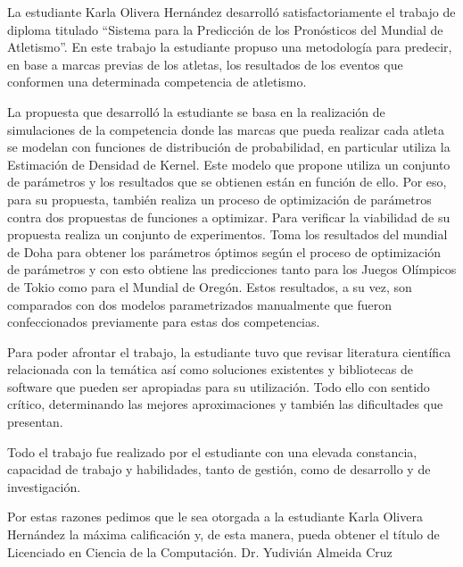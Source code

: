 \begin{opinion}
    
    La estudiante Karla Olivera Hernández desarrolló satisfactoriamente el trabajo de diploma titulado “Sistema para la Predicción de los Pronósticos del Mundial de Atletismo”. En este trabajo la estudiante propuso una metodología para predecir, en base a marcas previas de los atletas, los resultados de los eventos que conformen una determinada competencia de atletismo.

    La propuesta que desarrolló la estudiante se basa en la realización de simulaciones de la competencia donde las marcas que pueda realizar cada atleta se modelan con funciones de distribución de probabilidad, en particular utiliza la Estimación de Densidad de Kernel. Este modelo que propone utiliza un conjunto de parámetros y los resultados que se obtienen están en función de ello. Por eso, para su propuesta, también realiza un proceso de optimización de parámetros contra dos propuestas de funciones a optimizar. Para verificar la viabilidad de su propuesta realiza un conjunto de experimentos. Toma los resultados del mundial de Doha para obtener los parámetros óptimos según el proceso de optimización de parámetros y con esto obtiene las predicciones tanto para los Juegos Olímpicos de Tokio como para el Mundial de Oregón. Estos resultados, a su vez, son comparados con dos modelos parametrizados manualmente que fueron confeccionados previamente para estas dos competencias.
    
    Para poder afrontar el trabajo, la estudiante tuvo que revisar literatura científica relacionada con la temática así como soluciones existentes y bibliotecas de software que pueden ser apropiadas para su utilización. Todo ello con sentido crítico, determinando las mejores aproximaciones y también las dificultades que presentan.
    
    Todo el trabajo fue realizado por el estudiante con una elevada constancia, capacidad de trabajo y habilidades, tanto de gestión, como de desarrollo y de investigación.
    
    Por estas razones pedimos que le sea otorgada a la estudiante Karla Olivera Hernández la máxima calificación y, de esta manera, pueda obtener el título de Licenciado en Ciencia de la Computación.
    \BlankLine
    \BlankLine
    Dr. Yudivián Almeida Cruz

\end{opinion}